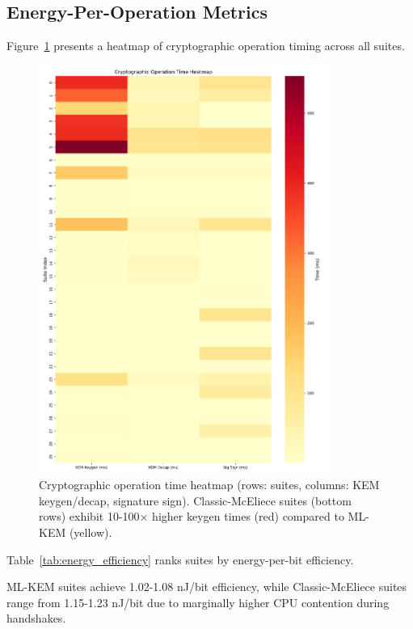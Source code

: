 \documentclass[11pt,a4paper]{article}
\begin{document}
\subsection{Energy-Per-Operation Metrics}

Figure~\ref{fig:energy_heatmap} presents a heatmap of cryptographic operation timing across all suites.

\begin{figure}[H]
\centering
\includegraphics[width=0.85\textwidth]{../figures/figure10_energy_heatmap_kem_operations.png}
\caption{Cryptographic operation time heatmap (rows: suites, columns: KEM keygen/decap, signature sign). Classic-McEliece suites (bottom rows) exhibit 10-100× higher keygen times (red) compared to ML-KEM (yellow).}
\label{fig:energy_heatmap}
\end{figure}

Table~\ref{tab:energy_efficiency} ranks suites by energy-per-bit efficiency.



ML-KEM suites achieve 1.02-1.08 nJ/bit efficiency, while Classic-McEliece suites range from 1.15-1.23 nJ/bit due to marginally higher CPU contention during handshakes.
\end{document}
